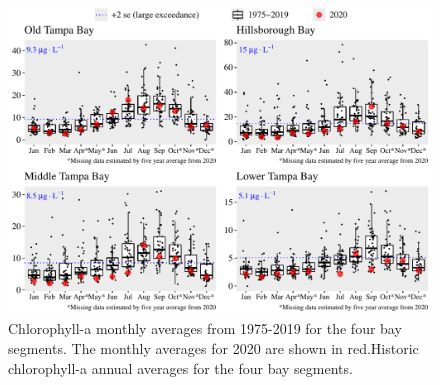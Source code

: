 \documentclass[final,t]{beamer}\usepackage[]{graphicx}\usepackage[]{color}
\begin{document}
\begin{frame}
\begin{columns}[t]
\begin{column}{.79\linewidth}
\begin{figure}
\centerline{\includegraphics[trim = 0cm 0cm 0cm 0cm, width=1\linewidth]{figure/chlboxplot.pdf}}
\caption{\footnotesize Chlorophyll-a monthly averages from 1975-2019 for the four bay segments. The monthly averages for 2020 are shown in red.Historic chlorophyll-a annual averages for the four bay segments.}
\label{fig:chlboxplot}
\end{figure}

\vspace{-0.4in}


\end{column}
\end{columns}
\end{frame}
\end{document}
